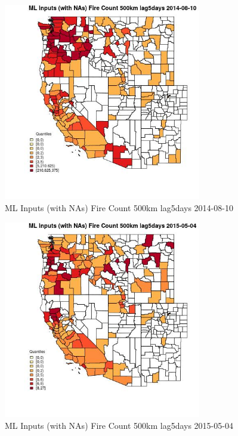 \begin{figure} 
\centering  
\includegraphics[width=0.77\textwidth]{Code_Outputs/Report_ML_input_PM25_Step4_part_e_de_duplicated_aves_compiled_2019-05-18wNAs_CountyFire_Count_500km_lag5daysMean2014-08-10_2014-08-10.jpg} 
\caption{\label{fig:Report_ML_input_PM25_Step4_part_e_de_duplicated_aves_compiled_2019-05-18wNAsCountyFire_Count_500km_lag5daysMean2014-08-10_2014-08-10}ML Inputs (with NAs) Fire Count 500km lag5days 2014-08-10} 
\end{figure} 
 

\begin{figure} 
\centering  
\includegraphics[width=0.77\textwidth]{Code_Outputs/Report_ML_input_PM25_Step4_part_e_de_duplicated_aves_compiled_2019-05-18wNAs_CountyFire_Count_500km_lag5daysMean2015-05-04_2015-05-04.jpg} 
\caption{\label{fig:Report_ML_input_PM25_Step4_part_e_de_duplicated_aves_compiled_2019-05-18wNAsCountyFire_Count_500km_lag5daysMean2015-05-04_2015-05-04}ML Inputs (with NAs) Fire Count 500km lag5days 2015-05-04} 
\end{figure} 
 

